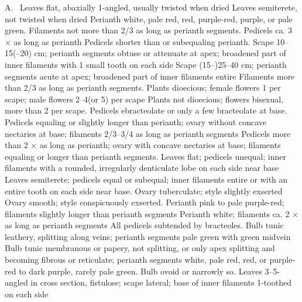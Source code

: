\documentclass{ctexart}
\begin{document}
\begin{Key*}{A.~}
\alter Leaves flat, abaxially 1-angled, usually twisted when dried
\alter Leaves semiterete, not twisted when dried
\alter Perianth white, pale red, red, purple-red, purple, or pale green.
\alter Filaments not more than 2/3 as long as perianth segments.
\alter Pedicels ca. 3 × as long as perianth
\alter Pedicels shorter than or subequaling perianth.
\alter Scape 10--15(--20) cm; perianth segments obtuse or attenuate at apex; broadened part of inner filaments with 1 small tooth on each side
\alter Scape (15--)25--40 cm; perianth segments acute at apex; broadened part of inner filaments entire
\alter Filaments more than 2/3 as long as perianth segments. 
\alter Plants dioecious; female flowers 1 per scape; male flowers 2--4(or 5) per scape
\alter Plants not dioecious; flowers bisexual, more than 2 per scape.
\alter Pedicels ebracteolate or only a few bracteolate at base.
\alter Pedicels equaling or slightly longer than perianth; ovary without concave nectaries at base; filaments 2/3--3/4 as long as perianth segments
\alter Pedicels more than 2 × as long as perianth; ovary with concave nectaries at base; filaments equaling or longer than perianth segments.
\alter Leaves flat; pedicels unequal; inner filaments with a rounded, irregularly denticulate lobe on each side near base
\alter Leaves semiterete; pedicels equal or subequal; inner filaments entire or with an entire tooth on each side near base.
\alter Ovary tuberculate; style slightly exserted
\alter Ovary smooth; style conspicuously exserted.
\alter Perianth pink to pale purple-red; filaments slightly longer than perianth segments
\alter Perianth white; filaments ca. 2 × as long as perianth segments
\alter All pedicels subtended by bracteoles.
\alter Bulb tunic leathery, splitting along veins; perianth segments pale green with green midvein
\alter Bulb tunic membranous or papery, not splitting, or only apex splitting and becoming fibrous or reticulate; perianth segments white, pale red, red, or purple-red to dark purple, rarely pale green.
\alter Bulb ovoid or narrowly so.
\alter Leaves 3--5-angled in cross section, fistulose; scape lateral; base of inner filaments 1-toothed on each side

\end{Key*}
\end{document}
